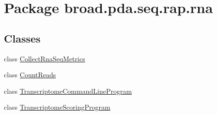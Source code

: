\hypertarget{namespacebroad_1_1pda_1_1seq_1_1rap_1_1rna}{\section{Package broad.\+pda.\+seq.\+rap.\+rna}
\label{namespacebroad_1_1pda_1_1seq_1_1rap_1_1rna}
}
\subsection*{Classes}
\begin{DoxyCompactItemize}
\item 
class \hyperlink{classbroad_1_1pda_1_1seq_1_1rap_1_1rna_1_1_collect_rna_seq_metrics}{Collect\+Rna\+Seq\+Metrics}
\item 
class \hyperlink{classbroad_1_1pda_1_1seq_1_1rap_1_1rna_1_1_count_reads}{Count\+Reads}
\item 
class \hyperlink{classbroad_1_1pda_1_1seq_1_1rap_1_1rna_1_1_transcriptome_command_line_program}{Transcriptome\+Command\+Line\+Program}
\item 
class \hyperlink{classbroad_1_1pda_1_1seq_1_1rap_1_1rna_1_1_transcriptome_scoring_program}{Transcriptome\+Scoring\+Program}
\end{DoxyCompactItemize}
